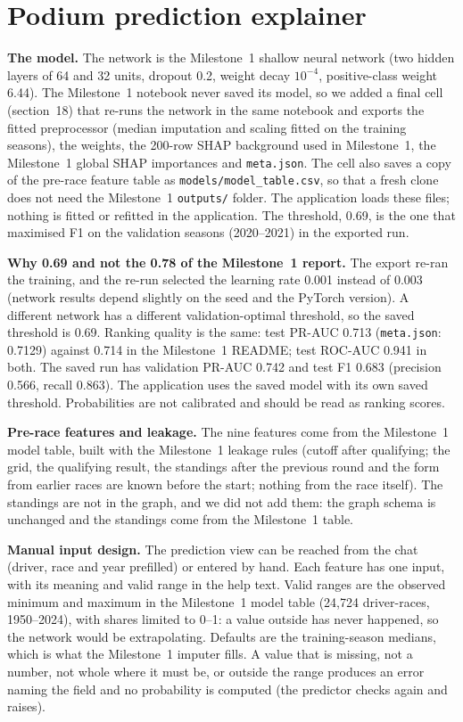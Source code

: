 \documentclass[10pt,a4paper]{article}
\newcommand{\code}[1]{\texttt{#1}}
\begin{document}
\section{Podium prediction explainer}

\textbf{The model.} The network is the Milestone~1 shallow neural network (two hidden layers of 64 and 32 units, dropout 0.2, weight decay $10^{-4}$, positive-class weight 6.44). The Milestone~1 notebook never saved its model, so we added a final cell (section~18) that re-runs the network in the same notebook and exports the fitted preprocessor (median imputation and scaling fitted on the training seasons), the weights, the 200-row SHAP background used in Milestone~1, the Milestone~1 global SHAP importances and \code{meta.json}. The cell also saves a copy of the pre-race feature table as \code{models/model\_table.csv}, so that a fresh clone does not need the Milestone~1 \code{outputs/} folder. The application loads these files; nothing is fitted or refitted in the application. The threshold, 0.69, is the one that maximised F1 on the validation seasons (2020--2021) in the exported run.

\textbf{Why 0.69 and not the 0.78 of the Milestone~1 report.} The export re-ran the training, and the re-run selected the learning rate 0.001 instead of 0.003 (network results depend slightly on the seed and the PyTorch version). A different network has a different validation-optimal threshold, so the saved threshold is 0.69. Ranking quality is the same: test PR-AUC 0.713 (\code{meta.json}: 0.7129) against 0.714 in the Milestone~1 README; test ROC-AUC 0.941 in both. The saved run has validation PR-AUC 0.742 and test F1 0.683 (precision 0.566, recall 0.863). The application uses the saved model with its own saved threshold. Probabilities are not calibrated and should be read as ranking scores.

\textbf{Pre-race features and leakage.} The nine features come from the Milestone~1 model table, built with the Milestone~1 leakage rules (cutoff after qualifying; the grid, the qualifying result, the standings after the previous round and the form from earlier races are known before the start; nothing from the race itself). The standings are not in the graph, and we did not add them: the graph schema is unchanged and the standings come from the Milestone~1 table.

\textbf{Manual input design.} The prediction view can be reached from the chat (driver, race and year prefilled) or entered by hand. Each feature has one input, with its meaning and valid range in the help text. Valid ranges are the observed minimum and maximum in the Milestone~1 model table (24,724 driver-races, 1950--2024), with shares limited to 0--1: a value outside has never happened, so the network would be extrapolating. Defaults are the training-season medians, which is what the Milestone~1 imputer fills. A value that is missing, not a number, not whole where it must be, or outside the range produces an error naming the field and no probability is computed (the predictor checks again and raises).
\end{document}
